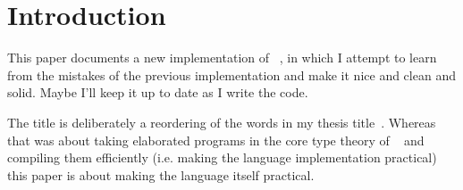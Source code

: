\section{Introduction}

This paper documents a new implementation of \Idris{}~\cite{plpv11},
in which I attempt to learn from the mistakes of the previous
implementation and make it nice and clean and solid. Maybe I'll keep
it up to date as I write the code.

The title is deliberately a reordering of the words in my thesis
title~\cite{brady-thesis}. Whereas that was about taking elaborated
programs in the core type theory of \Epigram{}~\cite{view-left} and
compiling them efficiently (i.e. making the language implementation
practical) this paper is about making the language itself practical.
